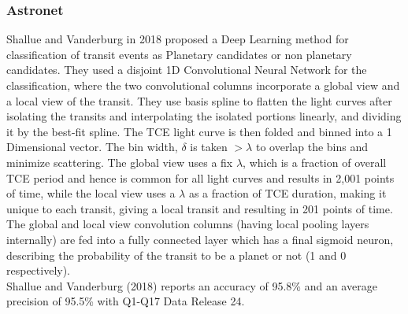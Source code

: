 \subsubsection{Astronet}
Shallue and Vanderburg in 2018 proposed a Deep Learning method for classification of transit events as Planetary candidates or non planetary candidates. They used a disjoint 1D Convolutional Neural Network for the classification, where the two convolutional columns incorporate a global view and a local view of the transit. They use basis spline to flatten the light curves after isolating the transits and interpolating the isolated portions linearly, and dividing it by the best-fit spline. The TCE light curve is then folded and binned into a 1 Dimensional vector. The bin width, $\delta$ is taken $> \lambda$ to overlap the bins and minimize scattering. The global view uses a fix $\lambda$, which is a fraction of overall TCE period and hence is common for all light curves and results in 2,001 points of time, while the local view uses a $\lambda$ as a fraction of TCE duration, making it unique to each transit, giving a local transit and resulting in 201 points of time. The global and local view convolution columns (having local pooling layers internally) are fed into a fully connected layer which has a final sigmoid neuron, describing the probability of the transit to be a planet or not (1 and 0 respectively).\\

Shallue and Vanderburg (2018) reports an accuracy of 95.8\% and an average precision of 95.5\% with Q1-Q17 Data Release 24.


